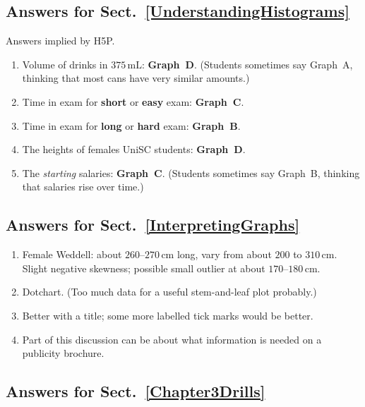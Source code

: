 \documentclass[
  11pt,
  a4paper,
  krantz2]{krantz}
\providecommand{\tightlist}{%
  \setlength{\itemsep}{0pt}\setlength{\parskip}{0pt}}
\begin{document}
\begin{footnotesize}
\subsection*{Answers for Sect.~\ref{UnderstandingHistograms}}\label{answers-for-sect.-refunderstandinghistograms}

Answers implied by H5P.

\begin{enumerate}
\def\labelenumi{\arabic{enumi}.}
\tightlist
\item
  Volume of drinks in \(375\,\text{mL}\): \textbf{Graph~D}.
  (Students sometimes say Graph~A, thinking that most cans have very similar amounts.)
\item
  Time in exam for \textbf{short} or \textbf{easy} exam: \textbf{Graph~C}.
\item
  Time in exam for \textbf{long} or \textbf{hard} exam: \textbf{Graph~B}.
\item
  The heights of females UniSC students: \textbf{Graph~D}.
\item
  The \emph{starting} salaries: \textbf{Graph~C}.
  (Students sometimes say Graph~B, thinking that salaries rise over time.)
\end{enumerate}

\subsection*{Answers for Sect.~\ref{InterpretingGraphs}}\label{answers-for-sect.-refinterpretinggraphs}

\begin{enumerate}
\def\labelenumi{\arabic{enumi}.}
\tightlist
\item
  Female Weddell: about \(260\)--\(270\,\text{cm}\) long, vary from about \(200\) to \(310\,\text{cm}\).
  Slight negative skewness; possible small outlier at about \(170\)--\(180\,\text{cm}\).
\item
  Dotchart.
  (Too much data for a useful stem-and-leaf plot probably.)
\item
  Better with a title; some more labelled tick marks would be better.
\item
  Part of this discussion can be about what information is needed on a publicity brochure.
\end{enumerate}

\subsection*{Answers for Sect.~\ref{Chapter3Drills}}\label{answers-for-sect.-refchapter3drills}


\end{footnotesize}
\end{document}
